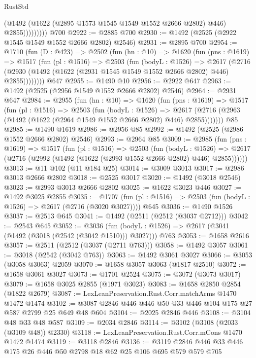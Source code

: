 \begin{lexlean}{RustStd}
\begin{coremodule}
{\begin{coremodule}
{{{{{{{{{{{{{                    (@1492 (@1622 (@2895 @1573 @1545 @1549 @1552 @2666 @2802) @446) @2855)))))))))
    @700
@2922 := @2885 @700
@2930 := @1492 (@2525 (@2922 @1545 @1549 @1552 @2666 @2802) @2546)
@2931 := @2895 @700
@2954 := @1710
    (fun (D : @423) =>
    @2502
      (fun (hn : @10) =>
      @1620
        (fun (pns : @1619) =>
        @1517
          (fun (pl : @1516) =>
          @2503
            (fun (bodyL : @1526) =>
            @2617
              (@2716 (@2930 (@1492 (@1622 (@2931 @1545 @1549 @1552 @2666 @2802) @446) @2855))))))))
    @647
@2955 := @1490 @10
@2956 := @2922 @647
@2963 := @1492 (@2525 (@2956 @1549 @1552 @2666 @2802) @2546)
@2964 := @2931 @647
@2984 := @2955
    (fun (hn : @10) =>
    @1620
      (fun (pns : @1619) =>
      @1517
        (fun (pl : @1516) =>
        @2503
          (fun (bodyL : @1526) =>
          @2617 (@2716 (@2963 (@1492 (@1622 (@2964 @1549 @1552 @2666 @2802) @446) @2855)))))))
    @85
@2985 := @1490 @1619
@2986 := @2956 @85
@2992 := @1492 (@2525 (@2986 @1552 @2666 @2802) @2546)
@2993 := @2964 @85
@3009 := @2985
    (fun (pns : @1619) =>
    @1517
      (fun (pl : @1516) =>
      @2503
        (fun (bodyL : @1526) =>
        @2617 (@2716 (@2992 (@1492 (@1622 (@2993 @1552 @2666 @2802) @446) @2855))))))
@3013 := @11 @102 (@11 @184 @25)
@3014 := @3009 @3013
@3017 := @2986 @3013 @2666 @2802
@3018 := @2525 @3017
@3020 := @1492 (@3018 @2546)
@3023 := @2993 @3013 @2666 @2802
@3025 := @1622 @3023 @446
@3027 := @1492 @3025 @2855
@3035 := @1707 (fun (pl : @1516) => @2503 (fun (bodyL : @1526) => @2617 (@2716 (@3020 @3027)))) @645
@3036 := @1490 @1526
@3037 := @2513 @645
@3041 := @1492 (@2511 (@2512 (@3037 @2712)))
@3042 := @2543 @645
@3052 := @3036
    (fun (bodyL : @1526) => @2617 (@3041 (@1492 (@3018 (@2542 (@3042 @1510))) @3027)))
    @763
@3053 := @1658 @2616
@3057 := @2511 (@2512 (@3037 (@2711 @763)))
@3058 := @1492 @3057
@3061 := @3018 (@2542 (@3042 @763))
@3063 := @1492 @3061 @3027
@3066 := @3053 (@3058 @3063) @2059
@3070 := @1658 @3057 @3063 (@1817 @2510)
@3072 := @1658 @3061 @3027
@3073 := @1701 @2524
@3075 := @3072 (@3073 @3017)
@3079 := @1658 @3025 @2855 (@1971 @3023)
@3083 := @1658 @2850 @2854 (@1822 @2679)
@3087 := LexLeanPreservation.Rust.Corr.matchArms @1470 @1472 @1474
@3102 := @3087 @2846 @446 @446 @50 @33 @446 @104 @175 @27 @587 @2799 @25 @649 @48 @604
@3104 := @2025 @2846 @446
@3108 := @3104 @48 @33 @48 @587
@3109 := @2034 @2846
@3114 := @3102 (@3108 (@2033 (@3109 @48)) @2330)
@3118 := LexLeanPreservation.Rust.Corr.mCons @1470 @1472 @1474
@3119 := @3118 @2846
@3136 := @3119 @2846 @446 @33 @446 @175 @26 @446 @50 @2798 @18 @62 @25 @106 @695 @579 @579 @705
}}}}}}}}}}}}}
\end{coremodule}}
\end{coremodule}
\end{lexlean}
